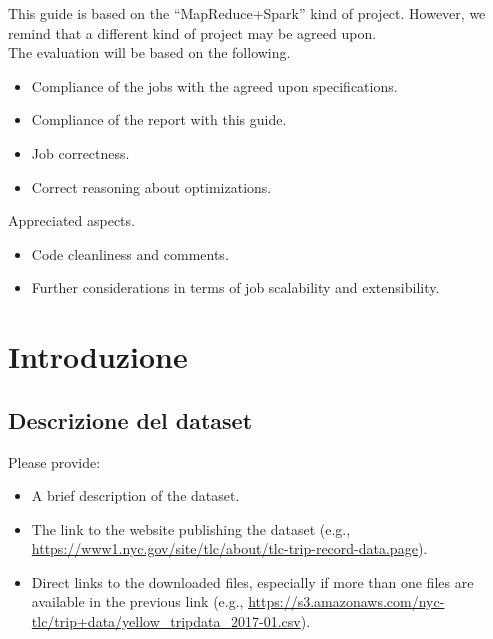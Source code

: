 \documentclass[10pt]{article}
\begin{document}
This guide is based on the ``MapReduce+Spark'' kind of project. However, we remind that a different kind of project may be agreed upon.
\\

The evaluation will be based on the following.
\begin{itemize}
\item Compliance of the jobs with the agreed upon specifications.
\item Compliance of the report with this guide.
\item Job correctness.
\item Correct reasoning about optimizations.
\end{itemize}

Appreciated aspects.
\begin{itemize}
\item Code cleanliness and comments.
\item Further considerations in terms of job scalability and extensibility.
\end{itemize}



\section{Introduzione}
\subsection{Descrizione del dataset}

Please provide:
\begin{itemize}
\item A brief description of the dataset.
\item The link to the website publishing the dataset (e.g., \url{https://www1.nyc.gov/site/tlc/about/tlc-trip-record-data.page}).
\item Direct links to the downloaded files, especially if more than one files are available in the previous link (e.g., \url{https://s3.amazonaws.com/nyc-tlc/trip+data/yellow_tripdata_2017-01.csv}).
\end{itemize}
\end{document}
